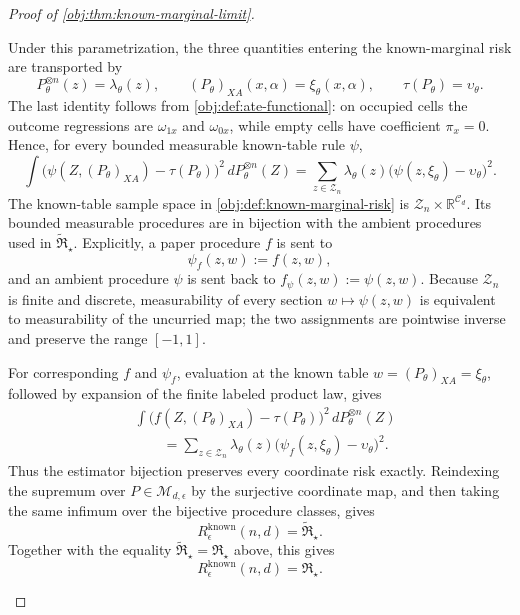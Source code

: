 \begin{proof}[Proof of \cref{obj:thm:known-marginal-limit}]
\begin{enumerate}
Under this parametrization, the three quantities entering the known-marginal risk are transported by
\[
P_\theta^{\otimes n}(z)=\lambda_\theta(z),
\qquad
(P_\theta)_{XA}(x,\alpha)=\xi_\theta(x,\alpha),
\qquad
\tau(P_\theta)=\upsilon_\theta .
\]
The last identity follows from \cref{obj:def:ate-functional}: on occupied cells the outcome regressions are \(\omega_{1x}\) and \(\omega_{0x}\), while empty cells have coefficient \(\pi_x=0\).  Hence, for every bounded measurable known-table rule \(\psi\),
\[
\int
\bigl(\psi(Z,(P_\theta)_{XA})-\tau(P_\theta)\bigr)^2
\,dP_\theta^{\otimes n}(Z)
=
\sum_{z\in\mathcal Z_n}\lambda_\theta(z)
\bigl(\psi(z,\xi_\theta)-\upsilon_\theta\bigr)^2 .
\]
The known-table sample space in \cref{obj:def:known-marginal-risk} is
\(\mathcal Z_n\times\mathbb R^{\mathcal C_d}\).  Its bounded measurable
procedures are in bijection with the ambient procedures used in
\(\widetilde{\mathfrak R}_\star\).  Explicitly, a paper procedure \(f\)
is sent to
\[
\psi_f(z,w):=f(z,w),
\]
and an ambient procedure \(\psi\) is sent back to
\(f_\psi(z,w):=\psi(z,w)\).  Because \(\mathcal Z_n\) is finite and
discrete, measurability of every section \(w\mapsto\psi(z,w)\) is
equivalent to measurability of the uncurried map; the two assignments are
pointwise inverse and preserve the range \([-1,1]\).

For corresponding \(f\) and \(\psi_f\), evaluation at the known table
\(w=(P_\theta)_{XA}=\xi_\theta\), followed by expansion of the finite
labeled product law, gives
\[
\begin{aligned}
&\int
\bigl(f(Z,(P_\theta)_{XA})-\tau(P_\theta)\bigr)^2
\,dP_\theta^{\otimes n}(Z)\\
&\qquad =
\sum_{z\in\mathcal Z_n}\lambda_\theta(z)
\bigl(\psi_f(z,\xi_\theta)-\upsilon_\theta\bigr)^2.
\end{aligned}
\]
Thus the estimator bijection preserves every coordinate risk exactly.
Reindexing the supremum over \(P\in\mathcal M_{d,\epsilon}\) by the
surjective coordinate map, and then taking the same infimum over the
bijective procedure classes, gives
\[
R_\epsilon^{\mathrm{known}}(n,d)
=
\widetilde{\mathfrak R}_\star .
\]
Together with the equality \(\widetilde{\mathfrak R}_\star=\mathfrak R_\star\) above, this gives
\[
R_\epsilon^{\mathrm{known}}(n,d)=\mathfrak R_\star .
\]


\end{enumerate}
\end{proof}
